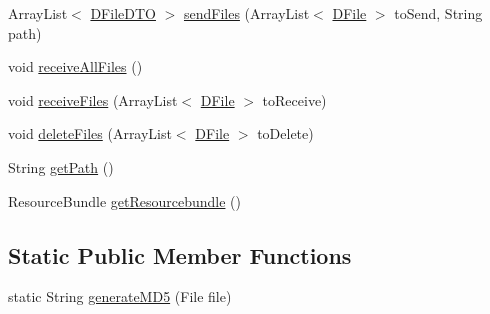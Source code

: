 \begin{DoxyCompactItemize}
\item 
Array\+List$<$ \mbox{\hyperlink{classes_1_1deusto_1_1bspq18_1_1e6_1_1_deusto_box_1_1_server_1_1dto_1_1_d_file_d_t_o}{D\+File\+D\+TO}} $>$ \mbox{\hyperlink{classes_1_1deusto_1_1bspq18_1_1e6_1_1_deusto_box_1_1_server_1_1gui_1_1installer_controller_aedb9be61d6d1c55bb60a3bbd40d5b156}{send\+Files}} (Array\+List$<$ \mbox{\hyperlink{classes_1_1deusto_1_1bspq18_1_1e6_1_1_deusto_box_1_1_server_1_1jdo_1_1data_1_1_d_file}{D\+File}} $>$ to\+Send, String path)
\item 
void \mbox{\hyperlink{classes_1_1deusto_1_1bspq18_1_1e6_1_1_deusto_box_1_1_server_1_1gui_1_1installer_controller_ac51209172af3ec342435b184b21d403c}{receive\+All\+Files}} ()
\item 
void \mbox{\hyperlink{classes_1_1deusto_1_1bspq18_1_1e6_1_1_deusto_box_1_1_server_1_1gui_1_1installer_controller_ac1a1e341d53c938aa24cfc915c9de355}{receive\+Files}} (Array\+List$<$ \mbox{\hyperlink{classes_1_1deusto_1_1bspq18_1_1e6_1_1_deusto_box_1_1_server_1_1jdo_1_1data_1_1_d_file}{D\+File}} $>$ to\+Receive)
\item 
void \mbox{\hyperlink{classes_1_1deusto_1_1bspq18_1_1e6_1_1_deusto_box_1_1_server_1_1gui_1_1installer_controller_a240275ef6b58a1dc4cf7a922ae08084a}{delete\+Files}} (Array\+List$<$ \mbox{\hyperlink{classes_1_1deusto_1_1bspq18_1_1e6_1_1_deusto_box_1_1_server_1_1jdo_1_1data_1_1_d_file}{D\+File}} $>$ to\+Delete)
\item 
String \mbox{\hyperlink{classes_1_1deusto_1_1bspq18_1_1e6_1_1_deusto_box_1_1_server_1_1gui_1_1installer_controller_ad6a6fccec9e9a0424c332e18be7ff8c5}{get\+Path}} ()
\item 
Resource\+Bundle \mbox{\hyperlink{classes_1_1deusto_1_1bspq18_1_1e6_1_1_deusto_box_1_1_server_1_1gui_1_1installer_controller_a04cb06e5289c8a34a0caa0eac6c89579}{get\+Resourcebundle}} ()
\end{DoxyCompactItemize}
\subsection*{Static Public Member Functions}
\begin{DoxyCompactItemize}
\item 
static String \mbox{\hyperlink{classes_1_1deusto_1_1bspq18_1_1e6_1_1_deusto_box_1_1_server_1_1gui_1_1installer_controller_af6035b743ddf1b9e6fbc54168149d359}{generate\+M\+D5}} (File file)
\end{DoxyCompactItemize}


